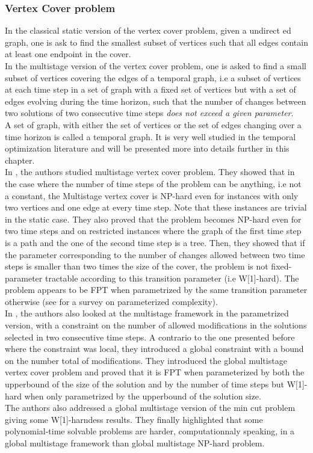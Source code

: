 \documentclass[a4paper]{book}
\begin{document}
\subsubsection{Vertex Cover problem}
In the classical static version of the {\sc vertex cover} problem, given a undirect    ed graph, one is ask to find the smallest subset of vertices such that all edges contain at least one endpoint in the cover.\\
In the multistage version of the {\sc vertex cover} problem, one is asked to find a small subset of vertices covering the edges of a temporal graph, i.e a subset of vertices at each time step in a set of graph with a fixed set of vertices but with a set of edges evolving during the time horizon, such that the number of changes between two solutions of two consecutive time steps \textit{does not exceed a given parameter}.\\
A set of graph, with either the set of vertices or the set of edges changing over a time horizon is called a temporal graph. It is very well studied in the temporal optimization literature and will be presented more into details further in this chapter.\\


In \cite{fluschnik2019multistage}, the authors studied {\sc multistage vertex cover} problem.  They showed that in the case where the number of time steps of the problem can be anything, i.e not a constant, the {\sc Multistage vertex cover} is NP-hard even for instances with only two vertices and one edge at every time step. Note that these instances are trivial in the static case. They also proved that the problem becomes NP-hard even for two time steps and on restricted instances where the graph of the first time step is a path and the one of the second time step is a tree. Then, they showed that if the parameter corresponding to the number of changes allowed between two time steps is smaller than two times the size of the cover, the problem is not fixed-parameter tractable according to this transition parameter (i.e W[1]-hard). The problem appears to be FPT when parametrized by the same transition parameter otherwise (see \cite{downey2012parameterized} for a survey on parameterized complexity). \\

In \cite{heeger2019multistage}, the authors also looked at the multistage framework in the parametrized version, with a constraint on the number of allowed modifications in the solutions selected in two consecutive time steps. A contrario to the one presented before where the constraint was local, they introduced a global constraint with a bound on the number total of modifications. They introduced the {\sc global multistage vertex cover} problem and proved that it is FPT when parameterized by both the upperbound of the size of the solution and by the number of time steps but W[1]-hard when only parametrized by the upperbound of the solution size. \\
The authors also addressed a global multistage version of the {\sc min cut} problem giving some W[1]-harndess results. They finally highlighted that some polynomial-time solvable problems are harder, computationnaly speaking, in a global multistage framework than global multistage NP-hard problem. 
\end{document}
